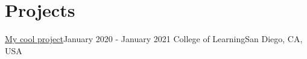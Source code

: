 \section{Projects}
\mySubHeadingListStart

  \mySubHeading
  {\href{https://www.example.com}{\textcolor{linkcolor}{My cool project}}}{January 2020 - January 2021}
  {College of Learning}{San Diego, CA, USA}
  \myItemListStart
  \myItemListEnd

\mySubHeadingListEnd

